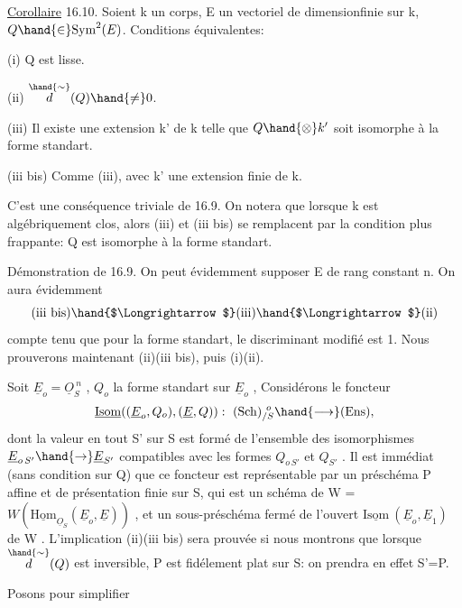\uline{Corollaire} 16.10. Soient k un corps, E un vectoriel de dimensionfinie
sur k, $Q \hand{\in} \mathrm{Sym}^2(E)$. Conditions équivalentes:

(i) Q est lisse.

(ii) $\overset{\hand{\sim}}{d}(Q) \hand{\neq} 0$.

(iii) Il existe une extension  k' de k telle que $Q\hand{\otimes} k'$ soit
isomorphe à la forme standart.

(iii bis) Comme (iii), avec k' une extension finie de k.

C'est une conséquence triviale de 16.9. On notera que lorsque k est
algébriquement clos, alors (iii) et (iii bis) se remplacent par la
condition plus frappante: Q est isomorphe à la forme standart.

Démonstration de 16.9. On  peut évidemment
supposer E de rang constant n. On aura évidemment
\[ \text{(iii bis)} \hand{$\Longrightarrow$} \text{(iii)} \hand{$\Longrightarrow$} \text{(ii)} \]
compte tenu que pour la forme standart, le discriminant modifié est 1.
Nous prouverons maintenant (ii)\hand{$\Longrightarrow$}(iii bis), puis (i)\hand{$\Longleftrightarrow$}(ii).

Soit $\underline{E}_o = \underline{O}_S^{\ n}$ , $Q_o$ la forme standart sur $\underline{E}_o$ , Considérons le
foncteur
\[ \underline{\mathrm{Isom}}( (\underline{E}_o,Q_o),(\underline{E},Q)) :\ (\mathrm{Sch})_{/S}^{\ o} \hand{\longrightarrow} (\mathrm{Ens}) , \]
dont la valeur en tout S' sur S est formé de l'ensemble des isomorphismes
$\underline{E}_{o\,S'} \hand{\to} \underline{E}_{S'}$ compatibles avec les formes $Q_{o\,S'}$ et $Q_{S'}$ . Il est immédiat
(sans condition sur  Q) que ce foncteur est représentable par un préschéma
P affine et de présentation finie sur S, qui est un schéma de W =
$W(\underline{\mathrm{Hom}}_{\underline{O}_S}(\underline{E}_o,\underline{E}))$ , et un sous-préschéma fermé de  l'ouvert
$\underline{\mathrm{Isom}}\ (\underline{E}_o,\underline{E}_1)$ de W \hand{/}. L'implication (ii)\hand{$\Longrightarrow$}(iii bis) sera prouvée si
nous montrons que lorsque $\overset{\hand{\sim}}{d}(Q)$ est inversible, P est fidélement plat
sur S: on prendra en effet S'=P.

Posons pour simplifier 

